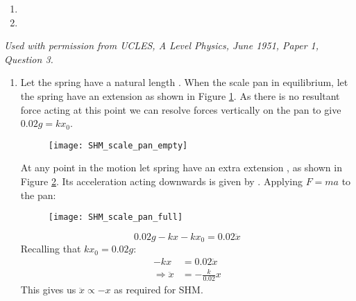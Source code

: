 
\begin{problem}[A1951PIQ3p]
{
\begin{enumerate}

	\item {}

	\item {} 
	
\end{enumerate}
}
{\textit{Used with permission from UCLES, A Level Physics, June 1951, Paper 1, Question 3.}}
{\begin{enumerate}

	\item Let the spring have a natural length . When the scale pan in equilibrium, let the spring have an extension  as shown in Figure \ref{fig:SHM_scale_pan_empty}. As there is no resultant force acting at this point we can resolve forces vertically on the pan to give $0.02g = kx_0$.
\begin{figure}
	\centering
	\texttt{[image: SHM\_scale\_pan\_empty]}
	\caption{}
	\label{fig:SHM_scale_pan_empty}
\end{figure}

\nl At any point in the motion let spring have an extra extension , as shown in Figure \ref{fig:SHM_scale_pan_full}. Its acceleration acting downwards is given by . Applying $F = ma$ to the pan:
\begin{figure}
	\centering
	\texttt{[image: SHM\_scale\_pan\_full]}
	\caption{}
	\label{fig:SHM_scale_pan_full}
\end{figure}
\begin{equation*}
0.02g - kx - kx_0 = 0.02\ddot{x}
\end{equation*}
Recalling that $kx_0 = 0.02g$:
\begin{align*}
- kx&= 0.02\ddot{x} \\
\Rightarrow \ddot{x}&=-\frac{k}{0.02}x
\end{align*}
This gives us $\ddot{x}\propto -x$ as required for SHM.


\end{enumerate}}
\end{problem}
